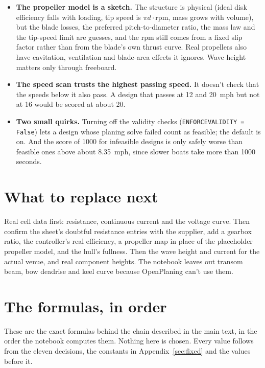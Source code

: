 \documentclass[11pt,a4paper]{article}
\renewcommand{\_}{\textunderscore\allowbreak}
\newcommand{\code}[1]{\texttt{#1}}
\begin{document}
\begin{itemize}
  \item \textbf{The propeller model is a sketch.} The structure is physical (ideal disk efficiency falls with loading, tip speed is $\pi d\cdot\mathrm{rpm}$, mass grows with volume), but the blade losses, the preferred pitch-to-diameter ratio, the mass law and the tip-speed limit are guesses,
        and the rpm still comes from a fixed slip factor rather than from the blade's own thrust curve. Real propellers also have cavitation, ventilation and blade-area effects it ignores. Wave height matters only through freeboard.
  \item \textbf{The speed scan trusts the highest passing speed.} It doesn't check that the speeds below it also pass. A design that passes at 12 and 20~mph but not at 16 would be scored at about 20.
  \item \textbf{Two small quirks.} Turning off the validity checks (\code{ENFORCE\_VALIDITY = False}) lets a design whose planing solve failed count as feasible; the default is on. And the score of 1000 for infeasible designs
        is only safely worse than feasible ones above about 8.35~mph, since slower boats take more than 1000 seconds.
\end{itemize}

\section*{What to replace next}

Real cell data first: resistance, continuous current and the voltage curve. Then confirm the sheet's doubtful resistance entries with the supplier, add a gearbox ratio, the controller's real efficiency, a propeller map in place of the placeholder propeller model, and the hull's fullness. Then the wave height and current for the actual venue,
and real component heights. The notebook leaves out transom beam, bow deadrise and keel curve because OpenPlaning can't use them.

\appendix
\section{The formulas, in order}
\label{sec:calculated}

These are the exact formulas behind the chain described in the main text, in the order the notebook computes them. Nothing here is
chosen. Every value follows from the eleven decisions, the constants in Appendix~\ref{sec:fixed} and the values before it.
\end{document}
